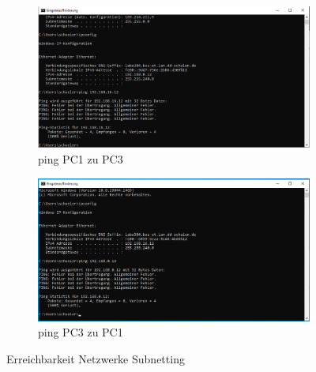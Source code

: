        \begin{figure}[H]
        \centering
            \begin{subfigure}{\textwidth}
                \centering
                \includegraphics[scale=0.5]{images/Unterteilung in Subnetze/SubnetzPC1_PingPC3.png}
                \caption{ping PC1 zu PC3}
            \end{subfigure}
            \begin{subfigure}{\textwidth}
                \centering
                \includegraphics[scale=0.5]{images/Unterteilung in Subnetze/SubnetzPC3_PingPC1.png}
                \caption{ping PC3 zu PC1}
            \end{subfigure}
        \caption{Erreichbarkeit Netzwerke Subnetting}
        \end{figure}

        \newpage
